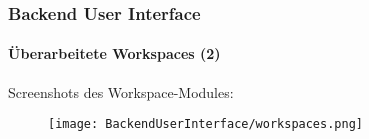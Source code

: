\begin{frame}[fragile]
	\frametitle{Backend User Interface}
	\framesubtitle{Überarbeitete Workspaces (2)}

	Screenshots des Workspace-Modules:

	\begin{figure}
		\texttt{[image: BackendUserInterface/workspaces.png]}
	\end{figure}

\end{frame}

